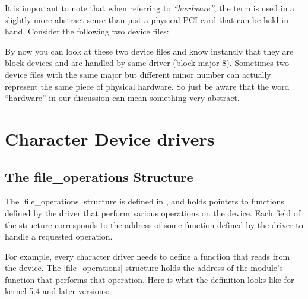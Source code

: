 \documentclass[10pt, oneside]{book}
\begin{document}
It is important to note that when referring to \emph{``hardware''},
the term is used in a slightly more abstract sense than just a physical PCI card that can be held in hand.
Consider the following two device files:


By now you can look at these two device files and know instantly that they are block devices and are handled by same driver (block major 8).
Sometimes two device files with the same major but different minor number can actually represent the same piece of physical hardware.
So just be aware that the word ``hardware'' in our discussion can mean something very abstract.

\section{Character Device drivers}
\label{sec:chardev}
\subsection{The file\_operations Structure}
\label{sec:file_operations}
The \cpp|file_operations| structure is defined in , and holds pointers to functions defined by the driver that perform various operations on the device.
Each field of the structure corresponds to the address of some function defined by the driver to handle a requested operation.

For example, every character driver needs to define a function that reads from the device.
The \cpp|file_operations| structure holds the address of the module's function that performs that operation.
Here is what the definition looks like for kernel 5.4 and later versions:
\end{document}
